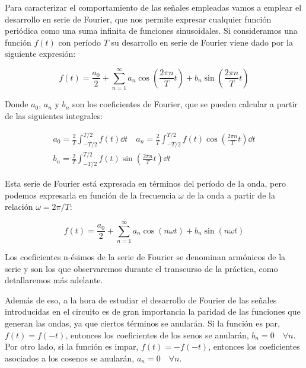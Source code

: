 \documentclass[a4paper,12pt,titlepage]{article}
\begin{document}
Para caracterizar el comportamiento de las señales empleadas vamos a emplear el desarrollo en serie de Fourier, que nos permite expresar cualquier función periódica como una suma infinita de funciones sinusoidales. Si consideramos una función $f(t)$ con período $T$ su desarrollo en serie de Fourier viene dado por la siguiente expresión:

\begin{equation}
    f(t) = \frac{a_0}{2} + \sum_{n=1}^{\infty} a_n \cos \left( \frac{2\pi n}{T} t \right) + b_n \sin \left( \frac{2\pi n}{T} t \right)
\end{equation}

Donde $a_0$, $a_n$ y $b_n$ son los coeficientes de Fourier, que se pueden calcular a partir de las siguientes integrales:

\begin{equation}
    \begin{gathered}
    a_0 = \frac{2}{T} \int_{-T/2}^{T/2} f(t) \dd t \quad a_n = \frac{2}{T} \int_{-T/2}^{T/2} f(t) \cos \left(\frac{2\pi n}{T}t\right) \dd t \\ b_n = \frac{2}{T} \int_{-T/2}^{T/2} f(t) \sin \left(\frac{2\pi n}{T}t\right) \dd t
    \end{gathered}
\end{equation}

Esta serie de Fourier está expresada en términos del período de la onda, pero podemos expresarla en función de la frecuencia $\omega$ de la onda a partir de la relación $\omega=2\pi/T$:

\begin{equation}
    f(t) = \frac{a_0}{2} + \sum_{n=1}^{\infty} a_n \cos \left( n\omega t \right) + b_n \sin \left( n\omega t \right)
\end{equation}

Los coeficientes n-ésimos de la serie de Fourier se denominan armónicos de la serie y son los que observaremos durante el transcurso de la práctica, como detallaremos más adelante.

Además de eso, a la hora de estudiar el desarrollo de Fourier de las señales introducidas en el circuito es de gran importancia la paridad de las funciones que generan las ondas, ya que ciertos términos se anularán. Si la función es par, $f(t) = f(-t)$, entonces los coeficientes de los senos se anularán, $b_n=0 \quad \forall n$. Por otro lado, si la función es impar, $f(t)=-f(-t)$, entonces los coeficientes asociados a los cosenos se anularán, $a_n=0 \quad \forall n$.
\end{document}
